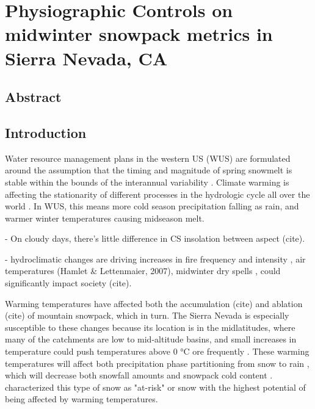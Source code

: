 \hypertarget{ch2}{%
\chapter{Physiographic Controls on midwinter snowpack metrics in Sierra Nevada, CA}\label{ch2}}


\hypertarget{ch1-abstract}{\section{Abstract}\label{ch1-abstract}}


\hypertarget{ch1-intro}{\section{Introduction}\label{ch1-intro}}


Water resource management plans in the western US (WUS) are formulated around the assumption that the timing and magnitude of spring snowmelt is stable within the bounds of the interannual variability \citep{livnehDroughtLessPredictable2020}. Climate warming is affecting the stationarity of different processes in the hydrologic cycle all over the world \citep{millyStationarityDeadWhither2008}. In WUS, this means more cold season precipitation falling as rain, and warmer winter temperatures causing midseason melt.


-	On cloudy days, there’s little difference in CS insolation between aspect (cite). 


- hydroclimatic changes are driving increases in fire frequency and intensity \citep{abatzoglouImpactAnthropogenicClimate2016}, air temperatures (Hamlet & Lettenmaier, 2007), midwinter dry spells \citep{hatchettMidwinterDrySpells2023}, could significantly impact society (cite). 

 
Warming temperatures have affected both the accumulation (cite) and ablation (cite) of mountain snowpack, which in turn. The Sierra Nevada is especially susceptible to these changes because its location is in the midlatitudes, where many of the catchments are low to mid-altitude basins, and small increases in temperature could push temperatures above 0 °C ore frequently \cite{gergelEffectsClimateChange2017}. These warming temperatures will affect both precipitation phase partitioning from snow to rain \citep{knowlesTrendsSnowfallRainfall2006}, which will decrease both snowfall amounts and snowpack cold content \citep{harpoldChangesSnowpackAccumulation2012a}. \cite{nolinMappingRiskSnow2006} characterized this type of snow as "at-risk" or snow with the highest potential of being affected by warming temperatures. 

